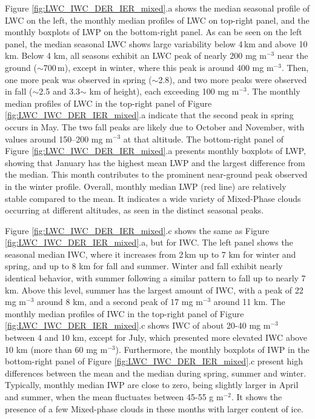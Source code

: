 Figure \ref{fig:LWC_IWC_DER_IER_mixed}.a shows the median seasonal profile of LWC on the left, the monthly median profiles of LWC on top-right panel, and the monthly boxplots of LWP on the bottom-right panel. As can be seen on the left panel, the median seasonal LWC shows large variability below 4\,km and above 10 km. Below 4 km, all seasons exhibit an LWC peak of nearly 200 mg m$^{-3}$ near the ground ($\sim$700\,m), except in winter, where this peak is around 400 mg m$^{-3}$. Then, one more peak was observed in spring ($\sim$2.8), and two more peaks were observed in fall ($\sim$2.5 and 3.3$\sim$ km of height), each exceeding 100 mg m$^{-3}$. The monthly median profiles of LWC in the top-right panel of Figure \ref{fig:LWC_IWC_DER_IER_mixed}.a indicate that the second peak in spring occurs in May. The two fall peaks are likely due to October and November, with values around 150–200 mg m$^{-3}$ at that altitude. The bottom-right panel of Figure \ref{fig:LWC_IWC_DER_IER_mixed}.a presents monthly boxplots of LWP, showing that January has the highest mean LWP and the largest difference from the median. This month contributes to the prominent near-ground peak observed in the winter profile. Overall, monthly median LWP (red line) are relatively stable compared to the mean. It indicates a wide variety of Mixed-Phase clouds occurring at different altitudes, as seen in the distinct seasonal peaks.


Figure \ref{fig:LWC_IWC_DER_IER_mixed}.c shows the same as Figure \ref{fig:LWC_IWC_DER_IER_mixed}.a, but for IWC. The left panel shows the seasonal median IWC, where it increases from 2\,km up to 7 km for winter and spring, and up to 8 km for fall and summer. Winter and fall exhibit nearly identical behavior, with summer following a similar pattern to fall up to nearly 7 km. Above this level, summer has the largest amount of IWC, with a peak of 22 mg m$^{-3}$ around 8 km, and a second peak of 17 mg m$^{-3}$ around 11 km. The monthly median profiles of IWC in the top-right panel of Figure \ref{fig:LWC_IWC_DER_IER_mixed}.c shows IWC of about 20-40 mg m$^{-3}$ between 4 and 10 km, except for July, which presented more elevated IWC above 10 km (more than 60 mg m$^{-3}$). Furthermore, the monthly boxplots of IWP in the bottom-right panel of Figure \ref{fig:LWC_IWC_DER_IER_mixed}.c present high differences between the mean and the median during spring, summer and winter. Typically, monthly median IWP are close to zero, being slightly larger in April and summer, when the mean fluctuates between 45-55 g m$^{-2}$. It shows the presence of a few Mixed-phase clouds in these months with larger content of ice.

